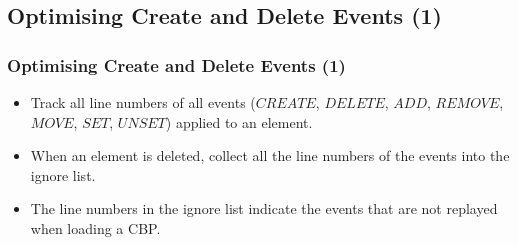 \documentclass{beamer}
\begin{document}
\begin{frame}[fragile]
\section{Optimising Create and Delete Events (1)}
\frametitle{Optimising Create and Delete Events (1)}
\begin{itemize}
    \item Track all line numbers of all events ($CREATE$, $DELETE$, $ADD$, $REMOVE$, $MOVE$, $SET$, $UNSET$) applied to an element. 
    \item When an element is deleted, collect all the line numbers of the events into the ignore list.
    \item The line numbers in the ignore list indicate the events that are not replayed when loading a CBP.
\end{itemize}
\end{frame}
\end{document}
